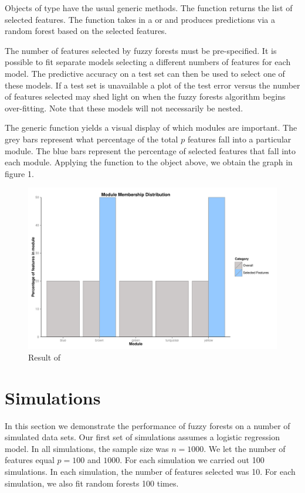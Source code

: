 \documentclass[article,shortnames]{jss}
\begin{document}
Objects of type  have the usual generic methods.  The function  returns the list
of selected features.  The function  takes in a  or 
 and produces predictions via a random forest based on the selected features.  

The number of features selected by fuzzy forests must be pre-specified.  It is possible to fit separate models
selecting a different numbers of features for each model.  The predictive accuracy on a test set can then 
be used to select one of these models.  If a test set is unavailable a plot of the test error versus the number 
of features selected may shed light on when the fuzzy forests algorithm begins over-fitting.
Note that these models will not necessarily be nested.
  
The generic function  yields a visual display of which modules are important.  The grey bars
represent what percentage of the total $p$ features fall into a particular module.  The blue bars represent
the percentage of selected features that fall into each module.  Applying the function  to the
object  above, we obtain the graph in figure 1.
\begin{figure}[hc]
\caption{Result of }
\includegraphics{ch3plot}
\end{figure}
\section{Simulations}
In this section we demonstrate the performance of fuzzy forests on a number of simulated data sets.
Our first set of simulations assumes a logistic regression model.  In all simulations, the sample size
was $n=1000$.  We let the number of features equal $p=100$ and $1000$.
For each simulation we carried out 100 simulations.  In each simulation, the number of features selected
was 10.  For each simulation, we also fit random forests 100 times.   
\end{document}
